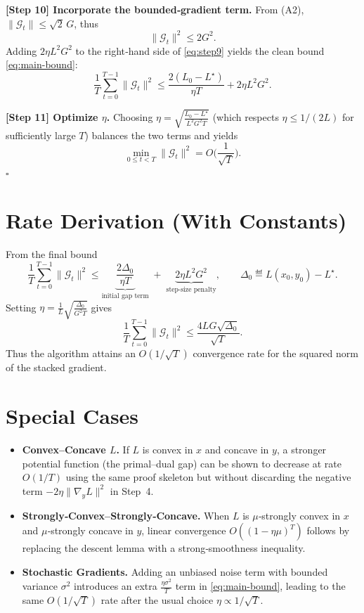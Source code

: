\documentclass{article}
\begin{document}
\noindent\textbf{[Step 10] Incorporate the bounded‑gradient term.}  
From (A2), $\|\mathcal{G}_t\| \le \sqrt{2}\,G$, thus
\[
\|\mathcal{G}_t\|^2\le 2G^2.
\]
Adding $2\eta L^2 G^2$ to the right‑hand side of \eqref{eq:step9} yields the clean bound \eqref{eq:main-bound}:
\[
\frac{1}{T}\sum_{t=0}^{T-1}\|\mathcal{G}_t\|^2
\le \frac{2(L_0-L^\star)}{\eta T}+2\eta L^2 G^2.
\]

\noindent\textbf{[Step 11] Optimize $\eta$.}  
Choosing $\eta = \sqrt{\frac{L_0-L^\star}{L^2 G^2 T}}$ (which respects $\eta\le 1/(2L)$ for sufficiently large $T$) balances the two terms and yields
\[
\min_{0\le t<T}\|\mathcal{G}_t\|^2 = O\!\Big(\frac{1}{\sqrt{T}}\Big).
\]
\hfill $\square$

\section*{Rate Derivation (With Constants)}
From the final bound
\[
\frac{1}{T}\sum_{t=0}^{T-1}\|\mathcal{G}_t\|^2
\le \underbrace{\frac{2\Delta_0}{\eta T}}_{\text{initial gap term}}
\;+\;
\underbrace{2\eta L^2 G^2}_{\text{step‑size penalty}},
\qquad \Delta_0\eqdef L(x_0,y_0)-L^\star.
\]
Setting $\eta = \frac{1}{L}\sqrt{\frac{\Delta_0}{G^2 T}}$ gives
\[
\frac{1}{T}\sum_{t=0}^{T-1}\|\mathcal{G}_t\|^2
\le \frac{4L G\sqrt{\Delta_0}}{\sqrt{T}}.
\]
Thus the algorithm attains an $O(1/\sqrt{T})$ convergence rate for the squared norm of the stacked gradient.

\section*{Special Cases}
\begin{itemize}
\item \textbf{Convex–Concave $L$.} If $L$ is convex in $x$ and concave in $y$, a stronger potential function (the primal–dual gap) can be shown to decrease at rate $O(1/T)$ using the same proof skeleton but without discarding the negative term $-2\eta\|\nabla_y L\|^2$ in Step~4.
\item \textbf{Strongly‑Convex–Strongly‑Concave.} When $L$ is $\mu$‑strongly convex in $x$ and $\mu$‑strongly concave in $y$, linear convergence $O((1-\eta\mu)^T)$ follows by replacing the descent lemma with a strong‑smoothness inequality.
\item \textbf{Stochastic Gradients.} Adding an unbiased noise term with bounded variance $\sigma^2$ introduces an extra $\frac{\eta\sigma^2}{T}$ term in \eqref{eq:main-bound}, leading to the same $O(1/\sqrt{T})$ rate after the usual choice $\eta\propto 1/\sqrt{T}$.
\end{itemize}
\end{document}
